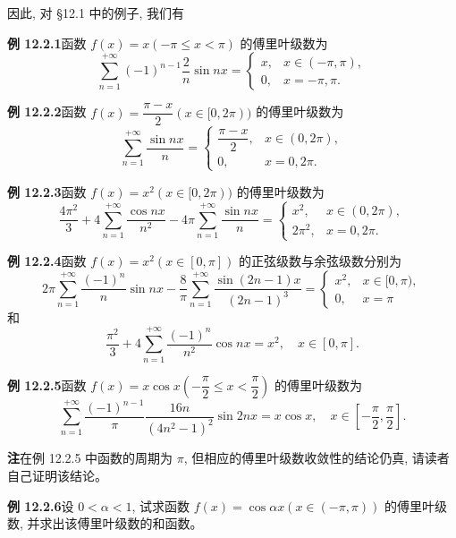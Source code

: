 \documentclass[UTF8, 12pt, fontset=fandol, oneside]{ctexart}
\begin{document}
因此, 对 \S 12.1 中的例子, 我们有

\noindent\textbf{例 12.2.1}\quad 函数 $f(x)=x(-\pi\leqslant x<\pi)$ 的傅里叶级数为
\[
  \sum_{n=1}^{+\infty}(-1)^{n-1}\frac2n\sin nx
  =
  \begin{cases}
    x, & x\in(-\pi,\pi),\\
    0, & x=-\pi,\pi.
  \end{cases}
\]

\noindent\textbf{例 12.2.2}\quad 函数 $f(x)=\dfrac{\pi-x}{2}(x\in[0,2\pi))$ 的傅里叶级数为
\[
  \sum_{n=1}^{+\infty}\frac{\sin nx}{n}
  =
  \begin{cases}
    \dfrac{\pi-x}{2}, & x\in(0,2\pi),\\
    0, & x=0,2\pi.
  \end{cases}
\]

\noindent\textbf{例 12.2.3}\quad 函数 $f(x)=x^2(x\in[0,2\pi))$ 的傅里叶级数为
\[
  \frac{4\pi^2}{3}+4\sum_{n=1}^{+\infty}\frac{\cos nx}{n^2}
  -4\pi\sum_{n=1}^{+\infty}\frac{\sin nx}{n}
  =
  \begin{cases}
    x^2, & x\in(0,2\pi),\\
    2\pi^2, & x=0,2\pi.
  \end{cases}
\]

\noindent\textbf{例 12.2.4}\quad 函数 $f(x)=x^2(x\in[0,\pi])$ 的正弦级数与余弦级数分别为
\[
  2\pi\sum_{n=1}^{+\infty}\frac{(-1)^n}{n}\sin nx
  -\frac8\pi\sum_{n=1}^{+\infty}\frac{\sin(2n-1)x}{(2n-1)^3}
  =
  \begin{cases}
    x^2, & x\in[0,\pi),\\
    0, & x=\pi
  \end{cases}
\]
和
\[
  \frac{\pi^2}{3}+4\sum_{n=1}^{+\infty}\frac{(-1)^n}{n^2}\cos nx=x^2,\quad x\in[0,\pi].
\]

\noindent\textbf{例 12.2.5}\quad 函数 $f(x)=x\cos x\left(-\dfrac{\pi}{2}\leqslant x<\dfrac{\pi}{2}\right)$ 的傅里叶级数为
\[
  \sum_{n=1}^{+\infty}\frac{(-1)^{n-1}}{\pi}\frac{16n}{(4n^2-1)^2}\sin2nx
  =x\cos x,\quad x\in\left[-\frac{\pi}{2},\frac{\pi}{2}\right].
\]

\noindent\textbf{注}\quad 在例 12.2.5 中函数的周期为 $\pi$, 但相应的傅里叶级数收敛性的结论仍真, 请读者自己证明该结论。

\noindent\textbf{例 12.2.6}\quad 设 $0<\alpha<1$, 试求函数 $f(x)=\cos\alpha x(x\in(-\pi,\pi))$ 的傅里叶级数, 并求出该傅里叶级数的和函数。
\end{document}
